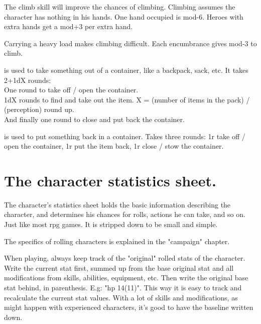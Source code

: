 The climb skill will improve the chances of climbing.
Climbing assumes the character has nothing in his hands. One hand occupied is mod-6. Heroes with extra hands get a mod+3 per extra hand.

Carrying a heavy load makes climbing difficult. Each encumbrance gives mod-3 to climb.


 is used to take something out of a container, like a backpack, sack, etc. It takes 2+1dX rounds: \\
One round to take off / open the container. \\
1dX rounds to find and take out the item. X = (number of items in the pack) / (perception) round up. \\
And finally one round to close and put back the container.


 is used to put something back in a container. Takes three rounds: 1r take off / open the container, 1r put the item back, 1r close / stow the container.


\closeactionslist

















\section*{The character statistics sheet.}

The character's statistics sheet holds the basic information describing the character, and determines his chances for rolls, actions he can take, and so on. Just like most rpg games. It is stripped down to be small and simple.

The specifics of rolling characters is explained in the "campaign" chapter.

When playing, always keep track of the "original" rolled stats of the character. Write the current stat first, summed up from the base original stat and all modifications from skills, abilities, equipment, etc. Then write the original base stat behind, in parenthesis. E.g: "hp 14(11)". This way it is easy to track and recalculate the current stat values. With a lot of skills and modifications, as might happen with experienced characters, it's good to have the baseline written down.


